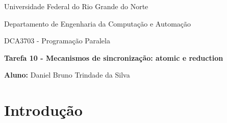 \documentclass[a4paper, 12pt]{article}
\begin{document}
	\begin{center}
		Universidade Federal do Rio Grande do Norte
		
		Departamento de Engenharia da Computação e Automação
		
		DCA3703 - Programação Paralela
		
		\textbf{Tarefa 10 - Mecanismos de sincronização: atomic e reduction}
		
		\textbf{Aluno:} Daniel Bruno Trindade da Silva
	\end{center}
	
	\section{Introdução}
	\vspace{0.7cm}
	
\end{document}
